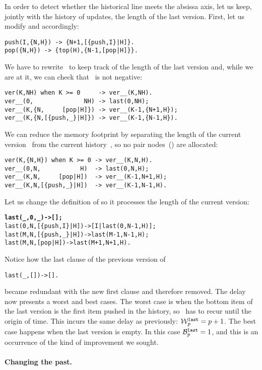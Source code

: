 In order to detect whether the historical line meets the absissa axis,
let us keep, jointly with the history of updates, the length of the
last version. First, let us modify  and
 accordingly:
\begin{verbatim}
push(I,{N,H}) -> {N+1,[{push,I}|H]}.
pop({N,H}) -> {top(H),{N-1,[pop|H]}}.
\end{verbatim}
We have to rewrite~ to keep track of the length of the
last version and, while we are at it, we can check that ~is
not negative:
\begin{verbatim}
ver(K,NH) when K >= 0     -> ver__(K,NH).
ver__(0,              NH) -> last(0,NH);
ver__(K,{N,     [pop|H]}) -> ver__(K-1,{N+1,H});
ver__(K,{N,[{push,_}|H]}) -> ver__(K-1,{N-1,H}).
\end{verbatim}
We can reduce the memory footprint by separating the length of the
current version~ from the current history~, so
no pair nodes~(\erlcode{\{\textvisiblespace,\textvisiblespace\}}) are
allocated:
\begin{verbatim}
ver(K,{N,H}) when K >= 0 -> ver__(K,N,H).
ver__(0,N,           H)  -> last(0,N,H);
ver__(K,N,     [pop|H])  -> ver__(K-1,N+1,H);
ver__(K,N,[{push,_}|H])  -> ver__(K-1,N-1,H).
\end{verbatim}
Let us change the definition of  so it processes the
length of the current version:
\begin{alltt}
\textbf{last(_,0,           _) -> [];}\hfill% \emph{Absissa \(0\)}
last(0,N,[\{push,I\}|H]) -> [I|last(0,N-1,H)];
last(M,N,[\{push,_\}|H]) -> last(M-1,N-1,H);
last(M,N,     [pop|H]) -> last(M+1,N+1,H).
\end{alltt}
Notice how the last clause of the previous version of 
\begin{alltt}
last(_,          []) -> [].\hfill% \emph{Useless now}
\end{alltt}
became redundant with the new first clause and therefore removed. The
delay now presents a worst and best cases. The worst case is when the
bottom item of the last version is the first item pushed in the
history, so ~has to recur until the origin of
time. This incurs the same delay as previously: \(\worst{last}{p} = p
+ 1\). The best case happens when the last version is empty. In this
case \(\best{last}{p} = 1\), and this is an occurrence of the kind of
improvement we sought.

\medskip

\paragraph{Changing the past.}
\label{changing_the_past}

